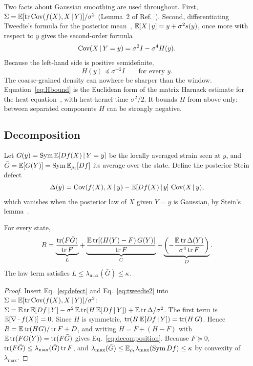 Two facts about Gaussian smoothing are used throughout. First, $\Sigma = \mathbb{E}[\operatorname{tr}\operatorname{Cov}(f(X),X\,|\,Y)]/\sigma^2$ (Lemma~2 of Ref.~\cite{namba2026arrow}). Second, differentiating Tweedie's formula for the posterior mean~\cite{efron2011}, $\mathbb{E}[X\,|\,y] = y + \sigma^2 s(y)$, once more with respect to $y$ gives the second-order formula
\begin{equation}
\operatorname{Cov}(X\,|\,Y = y) = \sigma^2 I - \sigma^4 H(y).
\label{eq:tweedie2}
\end{equation} Because the left-hand side is positive semidefinite,
\begin{equation}
H(y) \preceq \sigma^{-2} I \qquad \text{for every } y .
\label{eq:Hbound}
\end{equation}
The coarse-grained density can nowhere be sharper than the window. Equation~\eqref{eq:Hbound} is the Euclidean form of the matrix Harnack estimate for the heat equation~\cite{hamilton1993}, with heat-kernel time $\sigma^2/2$. It bounds $H$ from above only: between separated components $H$ can be strongly negative.

\subsection{Decomposition}
Let $G(y) = \operatorname{Sym}\mathbb{E}[Df(X)\,|\,Y = y]$ be the locally averaged strain seen at $y$, and $\bar G = \mathbb{E}[G(Y)] = \operatorname{Sym}\mathbb{E}_{\rho_t}[Df]$ its average over the state. Define the posterior Stein defect
\begin{equation}
\Delta(y) = \operatorname{Cov}(f(X),X\,|\,y) - \mathbb{E}[Df(X)\,|\,y]\,\operatorname{Cov}(X\,|\,y),
\label{eq:defect}
\end{equation}
which vanishes when the posterior law of $X$ given $Y = y$ is Gaussian, by Stein's lemma~\cite{stein1981}.

\begin{proposition}
\label{prop:decomposition}
For every state,
\begin{equation}
R = \underbrace{\frac{\operatorname{tr}(F\bar G)}{\operatorname{tr} F}}_{L}
+ \underbrace{\frac{\mathbb{E}\operatorname{tr}\!\left[(H(Y) - F)\,G(Y)\right]}{\operatorname{tr} F}}_{C}
+ \underbrace{\left(-\frac{\mathbb{E}\operatorname{tr}\Delta(Y)}{\sigma^4\operatorname{tr} F}\right)}_{D} .
\label{eq:decomposition}
\end{equation}
The law term satisfies $L \leq \lambda_{\max}(\bar G) \leq \kappa$.
\end{proposition}

\begin{proof}
Insert Eq.~\eqref{eq:defect} and Eq.~\eqref{eq:tweedie2} into $\Sigma = \mathbb{E}[\operatorname{tr}\operatorname{Cov}(f(X),X\,|\,Y)]/\sigma^2$:
$\Sigma = \mathbb{E}\operatorname{tr}\mathbb{E}[Df\,|\,Y] - \sigma^2\,\mathbb{E}\operatorname{tr}(H\,\mathbb{E}[Df\,|\,Y]) + \mathbb{E}\operatorname{tr}\Delta/\sigma^2$.
The first term is $\mathbb{E}[\nabla\cdot f(X)] = 0$. Since $H$ is symmetric, $\operatorname{tr}(H\,\mathbb{E}[Df\,|\,Y]) = \operatorname{tr}(H\,G)$. Hence $R = \mathbb{E}\operatorname{tr}(HG)/\operatorname{tr} F + D$, and writing $H = F + (H - F)$ with $\mathbb{E}\operatorname{tr}(FG(Y)) = \operatorname{tr}(F\bar G)$ gives Eq.~\eqref{eq:decomposition}. Because $F \succeq 0$, $\operatorname{tr}(F\bar G) \leq \lambda_{\max}(\bar G)\operatorname{tr} F$, and $\lambda_{\max}(\bar G) \leq \mathbb{E}_{\rho_t}\lambda_{\max}(\operatorname{Sym} Df) \leq \kappa$ by convexity of $\lambda_{\max}$.
\end{proof}

